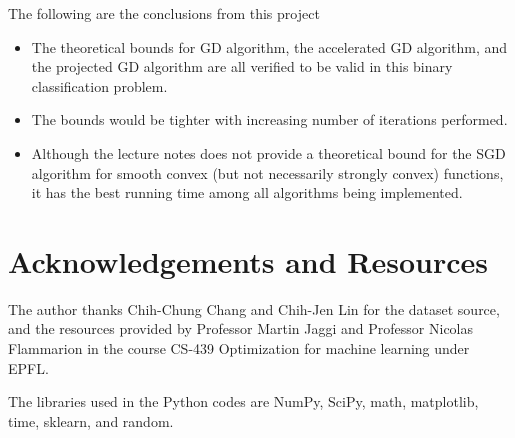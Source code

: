 \documentclass[10pt,conference,compsocconf]{IEEEtran}
\begin{document}
The following are the conclusions from this project
\begin{itemize}
\item The theoretical bounds for GD algorithm, the accelerated GD algorithm, and the projected GD algorithm are all verified to be valid in this binary classification problem.
\item The bounds would be tighter with increasing number of iterations performed.
\item Although the lecture notes does not provide a theoretical bound for the SGD algorithm for smooth convex (but not necessarily strongly convex) functions, it has the best running time among all algorithms being implemented.
\end{itemize}

\section*{Acknowledgements and Resources}
The author thanks Chih-Chung Chang and Chih-Jen Lin for the dataset source, and the resources provided by Professor Martin Jaggi and Professor Nicolas Flammarion in the course CS-439 Optimization for machine learning under EPFL.\par
The libraries used in the Python codes are NumPy, SciPy, math, matplotlib, time, sklearn, and random.

%
%
\end{document}
